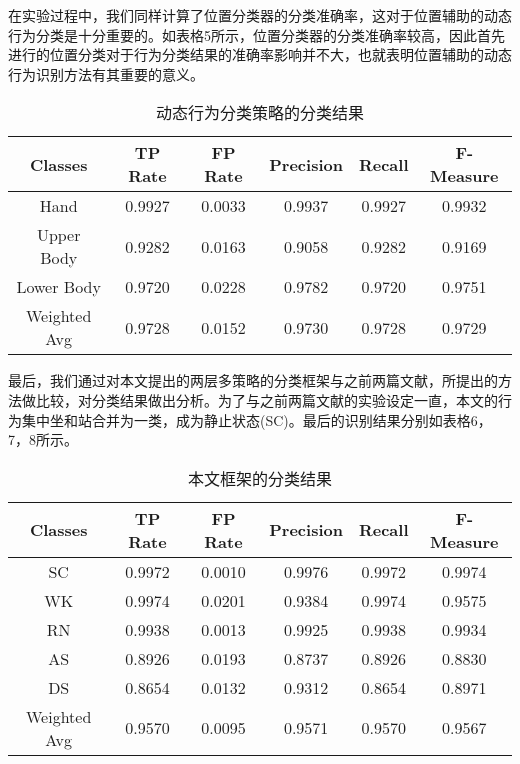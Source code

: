 \par 在实验过程中，我们同样计算了位置分类器的分类准确率，这对于位置辅助的动态行为分类是十分重要的。如表格5所示，位置分类器的分类准确率较高，因此首先进行的位置分类对于行为分类结果的准确率影响并不大，也就表明位置辅助的动态行为识别方法有其重要的意义。

 \begin{table}[!htb]
    \centering
    \caption{动态行为分类策略的分类结果}
    \begin{tabular}{cccccc}
    \toprule
    Classes & TP Rate & FP Rate & Precision & Recall & F-Measure \\
    \midrule
    Hand & 0.9927 & 0.0033 & 0.9937 & 0.9927 & 0.9932\\
    Upper Body & 0.9282 & 0.0163 & 0.9058 & 0.9282 & 0.9169	\\
    Lower Body & 0.9720 & 0.0228 & 0.9782 & 0.9720 & 0.9751	\\
    \hline
    Weighted Avg & 0.9728 & 0.0152 & 0.9730 & 0.9728 & 0.9729\\
    \bottomrule
    \end{tabular}
 \end{table}

\par 最后，我们通过对本文提出的两层多策略的分类框架与之前两篇文献\cite{orientationTransation1}，\cite{bisio2014comparison}所提出的方法做比较，对分类结果做出分析。为了与之前两篇文献的实验设定一直，本文的行为集中坐和站合并为一类，成为静止状态(SC)。最后的识别结果分别如表格6，7，8所示。
 \begin{table}[htb]
    \centering
    \caption{本文框架的分类结果}
    \begin{tabular}{cccccc}
    \toprule
    Classes & TP Rate & FP Rate & Precision & Recall & F-Measure \\
    \midrule
    SC & 0.9972 & 0.0010 & 0.9976 & 0.9972 & 0.9974 \\
    WK & 0.9974 & 0.0201 & 0.9384 & 0.9974 & 0.9575	\\
    RN & 0.9938 & 0.0013 & 0.9925 & 0.9938 & 0.9934	\\
    AS & 0.8926 & 0.0193 & 0.8737 & 0.8926 & 0.8830 \\
    DS & 0.8654 & 0.0132 & 0.9312 & 0.8654 & 0.8971	\\
    \hline
    Weighted Avg & 0.9570 & 0.0095 & 0.9571 & 0.9570 & 0.9567 \\
    \bottomrule
    \end{tabular}
 \end{table}

